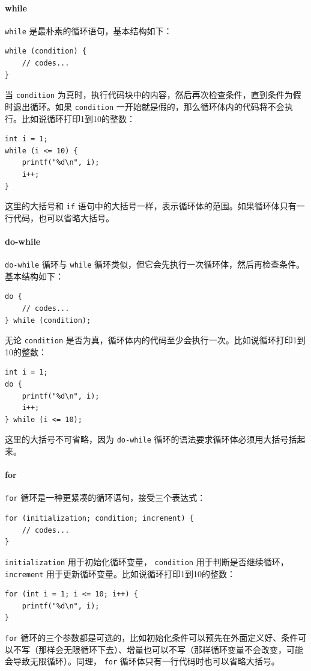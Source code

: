 \paragraph{while} \verb|while| 是最朴素的循环语句，基本结构如下：
\begin{verbatim}
while (condition) {
    // codes...
}
\end{verbatim}
当 \verb|condition| 为真时，执行代码块中的内容，然后再次检查条件，直到条件为假时退出循环。如果 \verb|condition| 一开始就是假的，那么循环体内的代码将不会执行。比如说循环打印1到10的整数：
\begin{verbatim}
int i = 1;
while (i <= 10) {
    printf("%d\n", i);
    i++;
}
\end{verbatim}
这里的大括号和 \verb|if| 语句中的大括号一样，表示循环体的范围。如果循环体只有一行代码，也可以省略大括号。

\paragraph{do-while} \verb|do-while| 循环与 \verb|while| 循环类似，但它会先执行一次循环体，然后再检查条件。基本结构如下：
\begin{verbatim}
do {
    // codes...
} while (condition);
\end{verbatim}
无论 \verb|condition| 是否为真，循环体内的代码至少会执行一次。比如说循环打印1到10的整数：
\begin{verbatim}
int i = 1;
do {
    printf("%d\n", i);
    i++;
} while (i <= 10);
\end{verbatim}
这里的大括号不可省略，因为 \verb|do-while| 循环的语法要求循环体必须用大括号括起来。

\paragraph{for} \verb|for| 循环是一种更紧凑的循环语句，接受三个表达式：
\begin{verbatim}
for (initialization; condition; increment) {
    // codes...
}
\end{verbatim}
\verb|initialization| 用于初始化循环变量， \verb|condition| 用于判断是否继续循环， \verb|increment| 用于更新循环变量。比如说循环打印1到10的整数：
\begin{verbatim}
for (int i = 1; i <= 10; i++) {
    printf("%d\n", i);
}
\end{verbatim}
\verb|for| 循环的三个参数都是可选的，比如初始化条件可以预先在外面定义好、条件可以不写（那样会无限循环下去）、增量也可以不写（那样循环变量不会改变，可能会导致无限循环）。同理， \verb|for| 循环体只有一行代码时也可以省略大括号。

